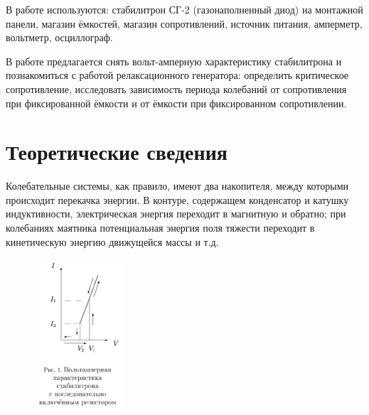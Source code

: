\documentclass[a4paper, 12pt]{article}%
\begin{document}
$\textbf{В работе используются}$: стабилитрон СГ-2 (газонаполненный диод) на монтажной панели, магазин ёмкостей, магазин сопротивлений, источник питания, амперметр, вольтметр, осциллограф.

В работе предлагается снять вольт-амперную характеристику стабилитрона и познакомиться с работой релаксационного генератора: определить критическое сопротивление, исследовать зависимость периода колебаний от сопротивления при фиксированной ёмкости и от ёмкости при фиксированном сопротивлении.

\section{Теоретические сведения}

 Колебательные системы, как правило, имеют два накопителя, между которыми происходит перекачка энергии. В контуре, содержащем конденсатор и катушку индуктивности, электрическая энергия переходит в магнитную и обратно; при колебаниях маятника потенциальная энергия поля тяжести переходит в кинетическую энергию движущейся массы и т.д. 

\begin{figure} 
\begin{center}
\includegraphics[width=0.3\textwidth]{./ann/1.PNG} 
\end{center}
\end{figure}
\end{document}
